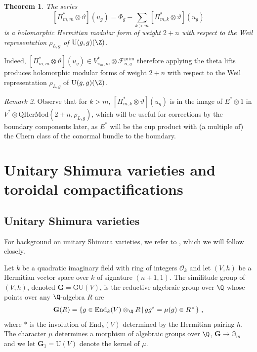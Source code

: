 \documentclass[11pt,letterpaper,english]{amsart}
\numberwithin{equation}{subsection}
\numberwithin{equation}{section}
\newcommand\cF{{\mathcal F}}
\newcommand\bfG{{\mathbf G}}
\newcommand{\QHerm}{\mathrm{QHerMod}}
\theoremstyle{plain}
\newtheorem{theorem}{Theorem}[section]
\theoremstyle{remark}
\newtheorem{remarque}[theorem]{Remark}
\begin{document}
\begin{theorem}\label{theorem:correction-general}
The series \[[\Pi_{m,m}^*\otimes \vartheta](u_g)=\Phi_g-\sum_{{k> m}} [\Pi_{m,k}^*\otimes \vartheta](u_g)\]
is a holomorphic Hermitian modular form of weight $2+n$ with respect to the Weil representation $\rho_{L,g}$ of $\mathrm{U}(g,g)(\Z)$.
\end{theorem}
Indeed,  $[\Pi_{m,m}^*\otimes \vartheta]   (u_g)\in V^{*}_{\pi_m,m}\otimes \cF_{n,g}^{\mathrm{prim}}$ therefore applying the theta lifts produces holomorphic modular forms of weight $2+n$ with respect to the Weil representation $\rho_{L,g}$ of $\mathrm{U}(g,g)(\Z)$.
\begin{remarque}
 Observe that for $k> m$, $[\Pi_{m,k}^*\otimes \vartheta](u_g)$ is in the image of $E^*\otimes 1$ in $V^*\otimes \QHerm(2+n,\rho_{L,g})$,  which will be useful for corrections by the boundary components later, as $E^*$ will be the cup product with (a multiple of) the Chern class of the conormal bundle to the boundary. 
\end{remarque}



\section{Unitary Shimura varieties and toroidal compactifications}\label{s:shimura-varieties}


\subsection{Unitary Shimura varieties}
For background on unitary Shimura varieties, we refer to \cite[Section 3.3]{Kudla-rapoport-SpeCyII}, which we will follow closely.

\medskip 



Let $k$ be a quadratic imaginary field with ring of integers $\mathcal{O}_k$ and let $(V,h)$ be a Hermitian vector space over $k$ of signature $(n+1,1)$. The similitude group of $(V,h)$, denoted $\bfG=\mathrm{GU}(V)$, is the reductive algebraic group over $\Q$ whose points over any $\Q$-algebra $R$ are 
\[\bfG(R)=\{g\in\mathrm{End}_k(V)\otimes_\Q R\,|\,gg^*=\mu(g)\in R^\times\}~,\] where $*$ is the involution of $\mathrm{End}_k(V)$ determined by the Hermitian pairing $h$. The character $\mu$ determines a morphism of algebraic groups over $\Q$, $\bfG\rightarrow \mathbb{G}_m$ and we let $\bfG_1=\mathrm{U}(V)$ denote the kernel of $\mu$. 
\medskip 
\end{document}
